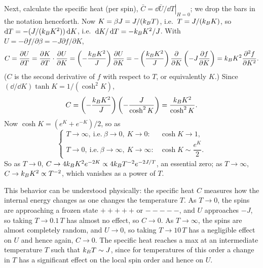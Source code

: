 Next, calculate the specific heat (per spin), $\bar C = \left.\dd\bar U/\dd T\right|_{H=0}$;
we drop the bars in the notation henceforth. Now
$K = \beta J = J/(k_{B} T)$, i.e.\ $T = J/(k_{B} K)$, so $\mathop{}\!\mathrm{d} T = -(J/(k_{B} K^2))\mathop{}\!\mathrm{d} K$, i.e.\
$\mathop{}\!\mathrm{d} K/\mathop{}\!\mathrm{d} T = -k_{B} K^2/J$. With $U = -\partial f/\partial \beta = -J\partial f/\partial K$,
\begin{equation}
  C = \frac{\partial U}{\partial T} = \frac{\partial K}{\partial T}\cdot\frac{\partial U}{\partial K}
    = \left(-\frac{k_{B} K^2}{J}\right)\frac{\partial U}{\partial K}
    = -\left(\frac{k_{B} K^2}{J}\right)\frac{\partial }{\partial K}\left(-J\frac{\partial f}{\partial K}\right)
    = k_{B} K^2\frac{\partial^2 f}{\partial K^2}.
\end{equation}
($C$ is the second derivative of $f$ with respect to $T$, or equivalently $K$.) Since
$(\dd/\dd K)\tanh K = 1/(\cosh^2K)$,
\begin{equation}
  C = \left(-\frac{k_{B} K^2}{J}\right)\left(-\frac{J}{\cosh^2K}\right) = \frac{k_{B} K^2}{\cosh^2K}.
\end{equation}
Now $\cosh K = (e^K+e^{-K})/2$, so as
\begin{equation}
  \begin{cases}
    T\to\infty,\ \text{i.e.}\ \beta\to 0,\ K\to 0: & \cosh K\to 1,\\[6pt]
    T\to 0,\ \text{i.e.}\ \beta\to\infty,\ K\to\infty: & \cosh K\sim\dfrac{e^K}{2}.
  \end{cases}
\end{equation}
So as $T\to 0$, $C\to 4k_{B} K^2e^{-2K}\propto 4k_{B} T^{-2}e^{-2J/T}$, an essential zero; as
$T\to\infty$, $C\to k_{B} K^2\propto T^{-2}$, which vanishes as a power of $T$.

\begin{diagram}
\end{diagram}

This behavior can be understood physically: the specific heat $C$ measures how the internal
energy changes as one changes the temperature $T$. As $T\to 0$, the spins are approaching a
frozen state $+++++$ or $-----$, and $U$ approaches $-J$, so taking $T\to 0.1\,T$ has almost
no effect, so $C\to 0$. As $T\to\infty$, the spins are almost completely random, and
$U\to 0$, so taking $T\to 10\,T$ has a negligible effect on $U$ and hence again, $C\to 0$. The
specific heat reaches a max at an intermediate temperature $T$ such that $k_{B} T\sim J$, since
for temperatures of this order a change in $T$ has a significant effect on the local spin
order and hence on $U$.

